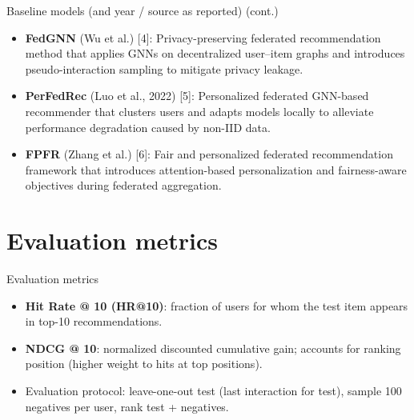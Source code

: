 \documentclass{beamer}
\begin{document}
\begin{frame}{Baseline models (and year / source as reported) (cont.)}
\small
\begin{itemize}
  \item \textbf{FedGNN} (Wu et al.) [4]: Privacy-preserving federated recommendation method that applies GNNs on decentralized user–item graphs and introduces pseudo-interaction sampling to mitigate privacy leakage.

  \item \textbf{PerFedRec} (Luo et al., 2022) [5]: Personalized federated GNN-based recommender that clusters users and adapts models locally to alleviate performance degradation caused by non-IID data.

  \item \textbf{FPFR} (Zhang et al.) [6]: Fair and personalized federated recommendation framework that introduces attention-based personalization and fairness-aware objectives during federated aggregation.
\end{itemize}
\end{frame}


\section{Evaluation metrics}
\begin{frame}{Evaluation metrics}
  \begin{itemize}
    \item \textbf{Hit Rate @ 10 (HR@10)}: fraction of users for whom the test item appears in top-10 recommendations.
    \item \textbf{NDCG @ 10}: normalized discounted cumulative gain; accounts for ranking position (higher weight to hits at top positions).
    \item Evaluation protocol: leave-one-out test (last interaction for test), sample 100 negatives per user, rank test + negatives.
  \end{itemize}
\end{frame}

\end{document}

